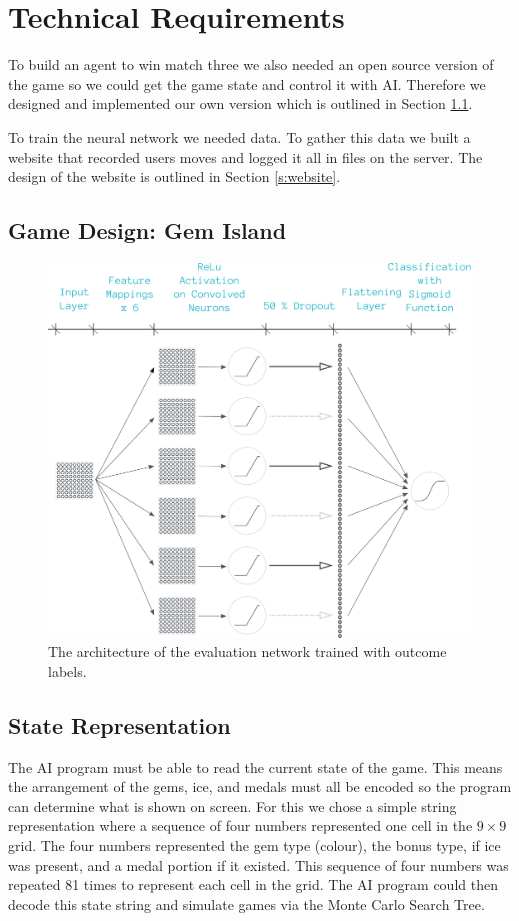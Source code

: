 \documentclass{bhamthesis}
\theoremstyle{definition}
\begin{document}
\chapter{Technical Requirements}
To build an agent to win match three we also needed an open source version of the game so we could get the game state and control it with AI. Therefore we designed and implemented our own version which is outlined in Section \ref{s:gamed}. 

To train the neural network we needed data. To gather this data we built a website that recorded users moves and logged it all in files on the server. The design of the website is outlined in Section \ref{s:website}.

\section{Game Design: Gem Island}\label{s:gamed}

\begin{figure}
	\includegraphics[width=\textwidth]{media/img/nnArch}
	\caption{The architecture of the evaluation network trained with outcome labels.}\label{f:gemIslandGame}
\end{figure}

\section{State Representation}\label{s:state}
The AI program must be able to read the current state of the game. This means the arrangement of the gems, ice, and medals must all be encoded so the program can determine what is shown on screen. For this we chose a simple string representation where a sequence of four numbers represented one cell in the $9 \times 9$ grid. The four numbers represented the gem type (colour), the bonus type, if ice was present, and a medal portion if it existed. This sequence of four numbers was repeated 81 times to represent each cell in the grid. The AI program could then decode this state string and simulate games via the Monte Carlo Search Tree.
\end{document}
